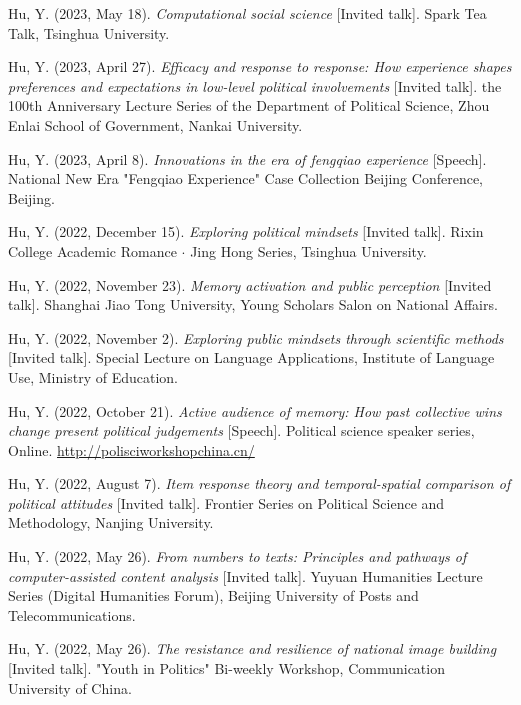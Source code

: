 \documentclass[
  12pt,
]
{article}
\newlength{\cslhangindent}
\newenvironment{CSLReferences}[2] %
 {\begin{list}{}{%
  \setlength{\itemindent}{0pt}
  \setlength{\leftmargin}{0pt}
  \setlength{\parsep}{0pt}
  \ifodd #1
   \setlength{\leftmargin}{\cslhangindent}
   \setlength{\itemindent}{-1\cslhangindent}
  \fi
  \setlength{\itemsep}{#2\baselineskip}}}
 {\end{list}}
\begin{document}
\begin{CSLReferences}{1}{0}
Hu, Y. (2023, May 18). \emph{Computational social science} {[}Invited
talk{]}. Spark Tea Talk, Tsinghua University.

Hu, Y. (2023, April 27). \emph{Efficacy and response to response: How
experience shapes preferences and expectations in low-level political
involvements} {[}Invited talk{]}. the 100th Anniversary Lecture Series
of the Department of Political Science, Zhou Enlai School of Government,
Nankai University.

Hu, Y. (2023, April 8). \emph{Innovations in the era of fengqiao
experience} {[}Speech{]}. National New Era "Fengqiao Experience" Case
Collection Beijing Conference, Beijing.

Hu, Y. (2022, December 15). \emph{Exploring political mindsets}
{[}Invited talk{]}. Rixin College Academic Romance {\(\cdot\)} Jing Hong
Series, Tsinghua University.

Hu, Y. (2022, November 23). \emph{Memory activation and public
perception} {[}Invited talk{]}. Shanghai Jiao Tong University, Young
Scholars Salon on National Affairs.

Hu, Y. (2022, November 2). \emph{Exploring public mindsets through
scientific methods} {[}Invited talk{]}. Special Lecture on Language
Applications, Institute of Language Use, Ministry of Education.

Hu, Y. (2022, October 21). \emph{Active audience of memory: How past
collective wins change present political judgements} {[}Speech{]}.
Political science speaker series, Online.
\url{http://polisciworkshopchina.cn/}

Hu, Y. (2022, August 7). \emph{Item response theory and temporal-spatial
comparison of political attitudes} {[}Invited talk{]}. Frontier Series
on Political Science and Methodology, Nanjing University.

Hu, Y. (2022, May 26). \emph{From numbers to texts: Principles and
pathways of computer-assisted content analysis} {[}Invited talk{]}.
Yuyuan Humanities Lecture Series (Digital Humanities Forum), Beijing
University of Posts and Telecommunications.

Hu, Y. (2022, May 26). \emph{The resistance and resilience of national
image building} {[}Invited talk{]}. "Youth in Politics" Bi-weekly
Workshop, Communication University of China.


\end{CSLReferences}
\end{document}
